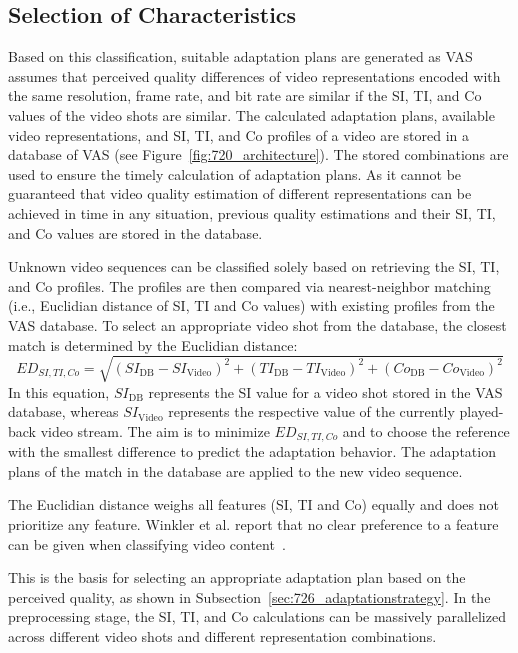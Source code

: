 \subsection{Selection of Characteristics}
\label{sec:724_selection}
Based on this classification, suitable adaptation plans are generated as \ac{VAS} assumes that perceived quality differences of video representations encoded with the same resolution, frame rate, and bit rate are similar if the \ac{SI}, \ac{TI}, and \ac{Co} values of the video shots are similar.
The calculated adaptation plans, available video representations, and \ac{SI}, \ac{TI}, and \ac{Co} profiles of a video are stored in a database of \ac{VAS} (see Figure~\ref{fig:720_architecture}). 
The stored combinations are used to ensure the timely calculation of adaptation plans. 
 As it cannot be guaranteed that video quality estimation of different representations can be achieved in time in any situation, previous quality estimations and their \ac{SI}, \ac{TI}, and \ac{Co} values are stored in the database. 
 
 Unknown video sequences can be classified solely based on retrieving the \ac{SI}, \ac{TI}, and \ac{Co} profiles. 
 The profiles are then compared via nearest-neighbor matching (i.e., Euclidian distance of SI, TI and Co values) with existing profiles from the \ac{VAS} database. 
 To select an appropriate video shot from the database, the closest match is determined by the Euclidian distance:
 \begin{equation}
 ED_{SI,TI,Co}=\sqrt{(SI_{\text{DB}} - SI_{\text{Video}})^2 + (TI_{\text{DB}} - TI_{\text{Video}})^2 + (Co_{\text{DB}} - Co_{\text{Video}})^2}
 \end{equation}
 In this equation, $SI_{\text{DB}}$ represents the SI value for a video shot stored in the \ac{VAS} database, whereas $SI_{\text{Video}}$ represents the respective value of the currently played-back video stream.
 The aim is to minimize $ED_{SI,TI, Co}$ and to choose the reference with the smallest difference to predict the adaptation behavior.
 The adaptation plans of the match in the database are applied to the new video sequence. 
 
The Euclidian distance weighs all features (SI, TI and Co) equally and does not prioritize any feature.
Winkler et al. report that no clear preference to a feature can be given when classifying video content~\cite{Winkler2012}.
 
This is the basis for selecting an appropriate adaptation plan based on the perceived quality, as shown in Subsection~\ref{sec:726_adaptationstrategy}.
In the preprocessing stage, the \ac{SI}, \ac{TI}, and \ac{Co} calculations can be massively parallelized across different video shots and different representation combinations. 
